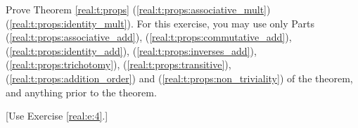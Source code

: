 \Newpage
\begin{exercise} %
	\label{real:e:5}
	Prove Theorem \ref{real:t:props} (\ref{real:t:props:associative_mult}) (\ref{real:t:props:identity_mult}). For this exercise, you may use only Parts (\ref{real:t:props:associative_add}), (\ref{real:t:props:commutative_add}), (\ref{real:t:props:identity_add}), (\ref{real:t:props:inverses_add}), (\ref{real:t:props:trichotomy}), (\ref{real:t:props:transitive}), (\ref{real:t:props:addition_order}) and (\ref{real:t:props:non_triviality}) of the theorem, and anything prior to the theorem.

	\hfill [Use Exercise \ref{real:e:4}.]
\end{exercise}

